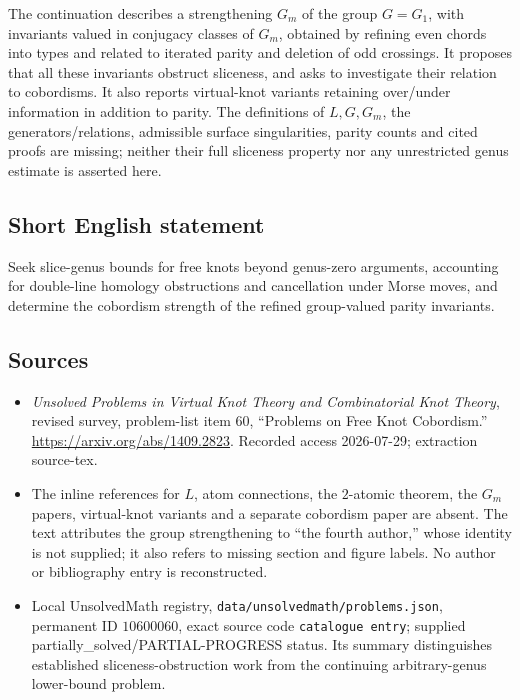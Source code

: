 \documentclass[11pt]{article}
\begin{document}
The continuation describes a strengthening \(G_m\) of the group \(G=G_1\), with invariants valued in conjugacy classes of \(G_m\), obtained by refining even chords into types and related to iterated parity and deletion of odd crossings. It proposes that all these invariants obstruct sliceness, and asks to investigate their relation to cobordisms. It also reports virtual-knot variants retaining over/under information in addition to parity. The definitions of \(L,G,G_m\), the generators/relations, admissible surface singularities, parity counts and cited proofs are missing; neither their full sliceness property nor any unrestricted genus estimate is asserted here.
\subsection{Short English statement}
Seek slice-genus bounds for free knots beyond genus-zero arguments, accounting for double-line homology obstructions and cancellation under Morse moves, and determine the cobordism strength of the refined group-valued parity invariants.
\subsection{Sources}
\begin{itemize}
\item \emph{Unsolved Problems in Virtual Knot Theory and Combinatorial Knot Theory}, revised survey, problem-list item 60, ``Problems on Free Knot Cobordism.'' \url{https://arxiv.org/abs/1409.2823}. Recorded access 2026-07-29; extraction source-tex.
\item The inline references for \(L\), atom connections, the \(2\)-atomic theorem, the \(G_m\) papers, virtual-knot variants and a separate cobordism paper are absent. The text attributes the group strengthening to ``the fourth author,'' whose identity is not supplied; it also refers to missing section and figure labels. No author or bibliography entry is reconstructed.
\item Local UnsolvedMath registry, \texttt{data/unsolvedmath/problems.json}, permanent ID \(10600060\), exact source code \texttt{catalogue entry}; supplied partially\_solved/PARTIAL-PROGRESS status. Its summary distinguishes established sliceness-obstruction work from the continuing arbitrary-genus lower-bound problem.
\end{itemize}
\end{document}
